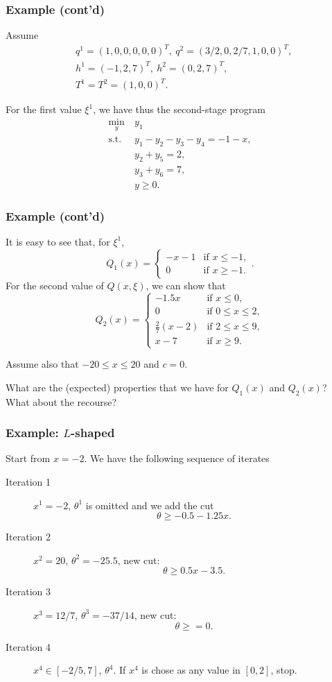 \documentclass{beamer}
\begin{document}
\begin{frame}
\frametitle{Example (cont'd)}

Assume
\begin{align*}
& q^1 = (1,0,0,0,0,0)^T,\ q^2 = (3/2, 0, 2/7, 1, 0, 0)^T, \\
& h^1 = (-1,2,7)^T,\ h^2 = (0,2,7)^T, \\
& T^1 = T^2 = (1,0,0)^T.
\end{align*}

\mbox{}

For the first value $\xi^1$, we have thus the second-stage program
\begin{align*}
\min_y\ & y_1 \\
\mbox{s.t. } & y_1 - y_2 - y_3 -y_4 = -1 - x, \\
& y_2 + y_5 = 2, \\
& y_3 + y_6 = 7, \\
& y \geq 0.
\end{align*}

\end{frame}

\begin{frame}
\frametitle{Example (cont'd)}

It is easy to see that, for $\xi^1$,
\[
Q_1(x) = \begin{cases}
-x-1 & \mbox{if } x \leq -1, \\ 0 & \mbox{if } x \geq -1.
\end{cases}.
\]
For the second value of $Q(x,\xi)$, we can show that
\[
Q_2(x) = \begin{cases}
-1.5x & \mbox{if } x \leq 0, \\
0 & \mbox{if } 0 \leq x \leq 2, \\
\frac{2}{7}(x-2) & \mbox{if } 2 \leq x \leq 9, \\
x - 7 & \mbox{if } x \geq 9.
\end{cases}
\]

Assume also that $-20 \leq x \leq 20$ and $c = 0$.

\mbox{}

What are the (expected) properties that we have for $Q_1(x)$ and
$Q_2(x)$?\\
What about the recourse?

\end{frame}

\begin{frame}
\frametitle{Example: $L$-shaped}

Start from $x = -2$. We have the following sequence of iterates
\begin{description}
\item[Iteration 1] $x^1 = -2$, $\theta^1$ is omitted and we add the cut
\[
\theta \geq -0.5 -1.25x.
\]
\item[Iteration 2] $x^2 = 20$, $\theta^2 = -25.5$, new cut:
\[
\theta \geq 0.5x - 3.5.
\]
\item[Iteration 3] $x^3 = 12/7$, $\theta^3 = -37/14$, new cut:
\[
\theta \geq= 0.
\]
\item[Iteration 4] $x^4 \in [-2/5, 7]$, $\theta^4$.
If $x^4$ is chose as any value in $[0,2]$, stop.
\end{description}

\end{frame}
\end{document}
